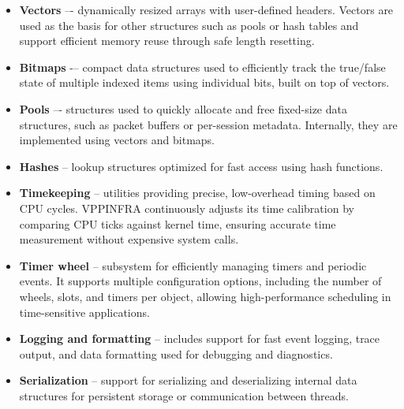 \begin{itemize}
  \item \textbf{Vectors} –- dynamically resized arrays with user-defined headers. 
Vectors are used as the basis for other structures such as pools or hash tables and support efficient memory reuse through safe length resetting.~\cite{fdio-vpp-infrastructure-2506}

  \item \textbf{Bitmaps} -–  compact data structures used to efficiently track the true/false state of multiple indexed items using individual bits, built on top of vectors.~\cite{fdio-vpp-infrastructure-2506}

  \item \textbf{Pools} –- structures used to quickly allocate and free fixed-size data structures, such as packet buffers or per-session metadata. 
Internally, they are implemented using vectors and bitmaps.~\cite{fdio-vpp-infrastructure-2506}

  \item \textbf{Hashes} -- lookup structures optimized for fast access using hash functions.~\cite{fdio-vpp-infrastructure-2506}

  \item \textbf{Timekeeping} -- utilities providing precise, low-overhead timing based on CPU cycles. 
VPPINFRA continuously adjusts its time calibration by comparing CPU ticks against kernel time, ensuring accurate time measurement without expensive system calls.~\cite{fdio-vpp-infrastructure-2506}

  \item \textbf{Timer wheel} -- subsystem for efficiently managing timers and periodic events. 
It supports multiple configuration options, including the number of wheels, slots, and timers per object, 
allowing high-performance scheduling in time-sensitive applications.~\cite{fdio-vpp-infrastructure-2506}

  \item \textbf{Logging and formatting} -- includes support for fast event logging, trace output, and data formatting used for debugging and diagnostics.~\cite{fdio-vpp-infrastructure-2506}

  \item \textbf{Serialization} -- support for serializing and deserializing internal data structures for persistent storage or communication between threads.~\cite{fdio-vpp-infrastructure-2506}
\end{itemize}

